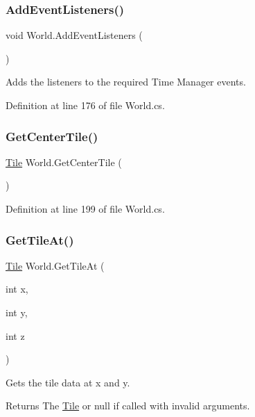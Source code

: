 \subsubsection{\texorpdfstring{Add\+Event\+Listeners()}{AddEventListeners()}}
{\footnotesize\ttfamily void World.\+Add\+Event\+Listeners (\begin{DoxyParamCaption}{ }\end{DoxyParamCaption})}



Adds the listeners to the required Time Manager events. 



Definition at line 176 of file World.\+cs.

\mbox{\label{class_world_ac608bea85e2936e7170eaa0d31c9dcb8}} 
\subsubsection{\texorpdfstring{Get\+Center\+Tile()}{GetCenterTile()}}
{\footnotesize\ttfamily \hyperlink{class_tile}{Tile} World.\+Get\+Center\+Tile (\begin{DoxyParamCaption}{ }\end{DoxyParamCaption})}



Definition at line 199 of file World.\+cs.

\mbox{\label{class_world_aeff2ae07aa8dcbe54fb9386ca043398c}} 
\subsubsection{\texorpdfstring{Get\+Tile\+At()}{GetTileAt()}}
{\footnotesize\ttfamily \hyperlink{class_tile}{Tile} World.\+Get\+Tile\+At (\begin{DoxyParamCaption}\item[{int}]{x,  }\item[{int}]{y,  }\item[{int}]{z }\end{DoxyParamCaption})}



Gets the tile data at x and y. 

\begin{DoxyReturn}{Returns}
The \hyperlink{class_tile}{Tile} or null if called with invalid arguments.
\end{DoxyReturn}

